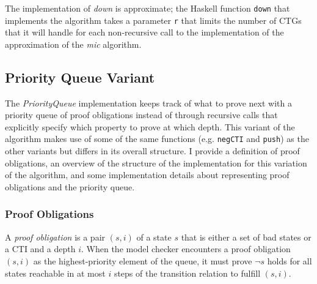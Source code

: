 \documentclass[12pt,a4paper,twoside,openright]{report}
\begin{document}
{The implementation of {\it down} is approximate; the Haskell function \verb,down, that implements
the algorithm takes a parameter \verb,r, that limits the number of CTGs that it will handle for
each non-recursive call to the implementation of the approximation of the {\it mic} algorithm.

\subsection{Priority Queue Variant}
\label{pqueue}

The \emph{PriorityQueue} implementation keeps track of what to prove next with a priority
queue of proof obligations instead of through recursive calls that explicitly specify which
property to prove at which depth. This variant of the algorithm makes
use of some of the same functions (e.g. \verb,negCTI, and \verb,push,) as the other variants but
differs in its overall structure.
I provide a definition of proof obligations, an
overview of the structure of the implementation for this variation of the algorithm,
and some implementation details about representing proof obligations and the priority queue.

\subsubsection{Proof Obligations}
A \emph{proof obligation} is a pair $(s,i)$ of a state $s$ that is either a set of bad states
or a CTI and a depth $i$. When the model checker encounters a proof obligation
$(s,i)$ as the highest-priority element of the queue, it must prove $\neg s$ holds for all states
reachable in at most $i$ steps of the transition relation to fulfill
$(s, i)$.

}
\end{document}
